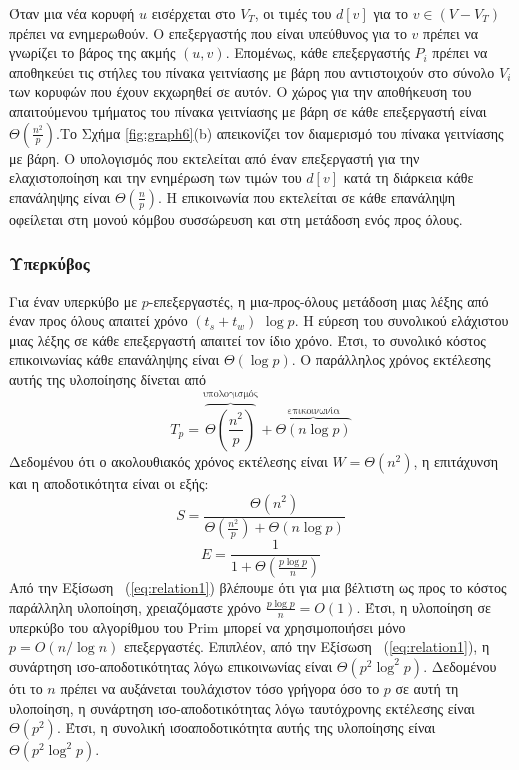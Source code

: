 \documentclass[12pt,a4paper]{article}
\begin{document}
Όταν μια νέα κορυφή $u$ εισέρχεται στο $V_T$, οι τιμές του $d[v]$ για το $v \in (V - V_T)$ πρέπει να ενημερωθούν. Ο επεξεργαστής που είναι υπεύθυνος για το $v$ πρέπει να γνωρίζει το βάρος της ακμής $(u, v)$. Επομένως, κάθε επεξεργαστής $P_i$ πρέπει να αποθηκεύει τις στήλες του πίνακα γειτνίασης με βάρη που αντιστοιχούν στο σύνολο $V_i$ των κορυφών που έχουν εκχωρηθεί σε αυτόν. Ο χώρος για την αποθήκευση του απαιτούμενου τμήματος του πίνακα γειτνίασης με βάρη σε κάθε επεξεργαστή είναι $\Theta\!\left(\frac{n^2}{p}\right)$.Το Σχήμα \ref{fig:graph6}(b) απεικονίζει τον διαμερισμό του πίνακα γειτνίασης με βάρη. Ο υπολογισμός που εκτελείται από έναν επεξεργαστή για την ελαχιστοποίηση και την ενημέρωση των τιμών του $d[v]$ κατά τη διάρκεια κάθε επανάληψης είναι $\Theta\!\left(\frac{n}{p}\right)$. Η επικοινωνία που εκτελείται σε κάθε επανάληψη οφείλεται στη μονού κόμβου συσσώρευση και στη μετάδοση ενός προς όλους.
\vspace{0.3cm}

\subsubsection*{Υπερκύβος}
Για έναν υπερκύβο με $p$-επεξεργαστές, η μια-προς-όλους μετάδοση μιας λέξης από έναν προς όλους απαιτεί χρόνο
$(t_s + t_w)$ $\log p$. Η εύρεση του συνολικού ελάχιστου μιας λέξης σε κάθε
επεξεργαστή απαιτεί τον ίδιο χρόνο. Έτσι, το συνολικό κόστος επικοινωνίας
κάθε επανάληψης είναι $\Theta(\log p)$. Ο παράλληλος χρόνος εκτέλεσης αυτής της υλοποίησης δίνεται από 
\[
T_p =
\overbrace{\Theta\!\left(\frac{n^2}{p}\right)}^{\text{υπολογισμός}}
+
\overbrace{\Theta(n \log p)}^{\text{επικοινωνία}}
\]
Δεδομένου ότι ο ακολουθιακός χρόνος εκτέλεσης είναι $W = \Theta(n^2)$, η επιτάχυνση και η αποδοτικότητα είναι οι εξής:
\[ S = \frac{\Theta(n^2)}{\Theta\!\left(\frac{n^2}{p}\right) + \Theta(n \log p)} \]
\begin{equation}
E = \frac{1}{1 + \Theta\!\left(\frac{p \log p}{n}\right)}
\label{eq:relation1}
\end{equation}
Από την Εξίσωση ~(\ref{eq:relation1}) βλέπουμε ότι για μια βέλτιστη ως προς το κόστος παράλληλη υλοποίηση, χρειαζόμαστε χρόνο \(\frac{p \log p}{n} = O(1)\). Έτσι, η υλοποίηση σε υπερκύβο του αλγορίθμου του \foreignlanguage{english}{Prim} μπορεί να χρησιμοποιήσει μόνο \( p = O(n / \log n) \) επεξεργαστές. Επιπλέον, από την Εξίσωση ~(\ref{eq:relation1}), η συνάρτηση ισο-αποδοτικότητας λόγω
επικοινωνίας είναι $\Theta(p^2 \log^2 p)$. Δεδομένου ότι το $n$ πρέπει να αυξάνεται τουλάχιστον τόσο γρήγορα όσο το $p$ σε αυτή τη
υλοποίηση, η συνάρτηση ισο-αποδοτικότητας λόγω ταυτόχρονης εκτέλεσης είναι $\Theta(p^2)$. Έτσι, η συνολική
ισοαποδοτικότητα αυτής της υλοποίησης είναι $\Theta(p^2 \log^2 p)$.
\end{document}

